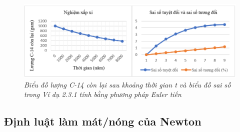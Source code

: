\begin{figure}[H]
	\centering
	\includegraphics[scale=0.7]{Images/hinh_2_7.png}
	\caption[Biểu đồ lượng C-14 còn lại sau khoảng thời gian t và biểu đồ sai số trong Ví dụ 2.3.1 tính bằng phương pháp Euler tiến]{\itshape\fontsize{13pt}{0pt}\selectfont\centering Biểu đồ lượng C-14 còn lại sau khoảng thời gian t và biểu đồ sai số trong Ví dụ 2.3.1 tính bằng phương pháp Euler tiến}
	\label{hinh2.7}
\end{figure}
\subsection{Định luật làm mát/nóng của Newton}
